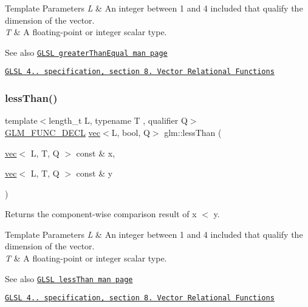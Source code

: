 \begin{DoxyTemplParams}{Template Parameters}
{\em L} & An integer between 1 and 4 included that qualify the dimension of the vector. \\
\hline
{\em T} & A floating-\/point or integer scalar type.\\
\hline
\end{DoxyTemplParams}
\begin{DoxySeeAlso}{See also}
\href{http://www.opengl.org/sdk/docs/manglsl/xhtml/greaterThanEqual.xml}{\tt G\+L\+SL greater\+Than\+Equal man page} 

\href{http://www.opengl.org/registry/doc/GLSLangSpec.4.20.8.pdf}{\tt G\+L\+SL 4.. specification, section 8. Vector Relational Functions} 
\end{DoxySeeAlso}
\mbox{\label{group__core__func__vector__relational_ga314be073c42278ccb6fe7a7958213824}} 
\subsubsection{\texorpdfstring{less\+Than()}{lessThan()}}
{\footnotesize\ttfamily template$<$length\+\_\+t L, typename T , qualifier Q$>$ \\
\mbox{\hyperlink{setup_8hpp_ab2d052de21a70539923e9bcbf6e83a51}{G\+L\+M\+\_\+\+F\+U\+N\+C\+\_\+\+D\+E\+CL}} \mbox{\hyperlink{structglm_1_1vec}{vec}}$<$L, bool, Q$>$ glm\+::less\+Than (\begin{DoxyParamCaption}\item[{\mbox{\hyperlink{structglm_1_1vec}{vec}}$<$ L, T, Q $>$ const \&}]{x,  }\item[{\mbox{\hyperlink{structglm_1_1vec}{vec}}$<$ L, T, Q $>$ const \&}]{y }\end{DoxyParamCaption})}

Returns the component-\/wise comparison result of x $<$ y.


\begin{DoxyTemplParams}{Template Parameters}
{\em L} & An integer between 1 and 4 included that qualify the dimension of the vector. \\
\hline
{\em T} & A floating-\/point or integer scalar type.\\
\hline
\end{DoxyTemplParams}
\begin{DoxySeeAlso}{See also}
\href{http://www.opengl.org/sdk/docs/manglsl/xhtml/lessThan.xml}{\tt G\+L\+SL less\+Than man page} 

\href{http://www.opengl.org/registry/doc/GLSLangSpec.4.20.8.pdf}{\tt G\+L\+SL 4.. specification, section 8. Vector Relational Functions} 
\end{DoxySeeAlso}
\mbox{\label{group__core__func__vector__relational_ga51bf75522dbe1fa5e7806eb9b825ab6a}} 
